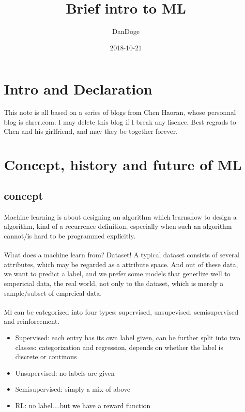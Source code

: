 \documentclass{article}
\title{Brief intro to ML}
\date{2018-10-21}
\author{DanDoge}
\begin{document}
\section{Intro and Declaration}
  This note is all based on a series of blogs from Chen Haoran, whose personnal blog is chrer.com. I may delete this blog if I break any lisence. Best regrads to Chen and his girlfriend, and may they be together forever.

\section{Concept, history and future of ML}
  \subsection{concept}
    \paragraph{} Machine learning is about designing an algorithm which \"learns\" how to design a algorithm, kind of a recurrence definition, especially when such an algorithm cannot/is hard to be programmed explicitly.
    \paragraph{} What does a machine learn from? Dataset! A typical dataset consists of several attributes, which may be regarded as a attribute space. And out of these data, we want to predict a label, and we prefer some models that generlize well to empericial data, the real world, not only to the dataset, which is merely a sample/subset of empreical data.
    \paragraph{} Ml can be categorized into four types: supervised, unsupevised, semisupervised and reinforcement.
      \begin{itemize}
        \item Supervised: each entry has its own label given, can be further split into two classes: categorization and regression, depends on whether the label is discrete or continous
        \item Unsupervised: no labels are given
        \item Semisupervised: simply a mix of above
        \item RL: no label....but we have a reward function
      \end{itemize}
\end{document}
